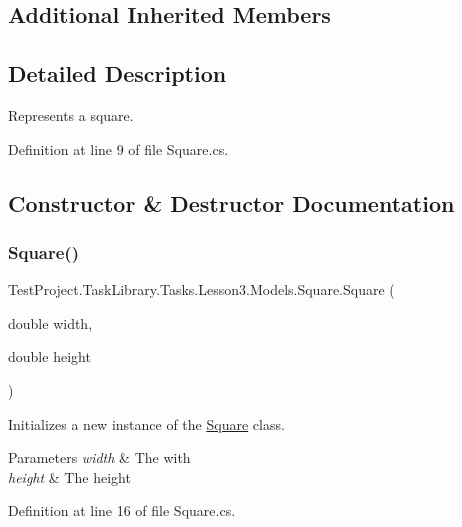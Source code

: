 \subsection*{Additional Inherited Members}


\subsection{Detailed Description}
Represents a square. 



Definition at line 9 of file Square.\+cs.



\subsection{Constructor \& Destructor Documentation}
\mbox{\label{class_test_project_1_1_task_library_1_1_tasks_1_1_lesson3_1_1_models_1_1_square_a420f7744d842fff348d12d3cacd6cd25}} 
\subsubsection{\texorpdfstring{Square()}{Square()}}
{\footnotesize\ttfamily Test\+Project.\+Task\+Library.\+Tasks.\+Lesson3.\+Models.\+Square.\+Square (\begin{DoxyParamCaption}\item[{double}]{width,  }\item[{double}]{height }\end{DoxyParamCaption})}



Initializes a new instance of the \mbox{\hyperlink{class_test_project_1_1_task_library_1_1_tasks_1_1_lesson3_1_1_models_1_1_square}{Square}} class. 


\begin{DoxyParams}{Parameters}
{\em width} & The with\\
\hline
{\em height} & The height\\
\hline
\end{DoxyParams}


Definition at line 16 of file Square.\+cs.



